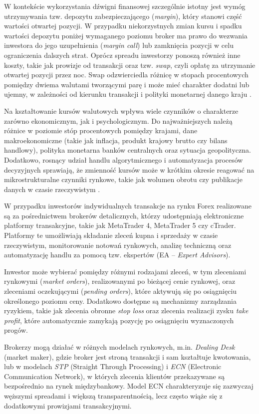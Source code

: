 W kontekście wykorzystania dźwigni finansowej szczególnie istotny jest wymóg utrzymywania tzw. depozytu zabezpieczającego (\textit{margin}), który stanowi część wartości otwartej pozycji. 
W przypadku niekorzystnych zmian kursu i spadku wartości depozytu poniżej wymaganego poziomu broker ma prawo do wezwania inwestora do jego uzupełnienia (\textit{margin call}) 
lub zamknięcia pozycji w celu ograniczenia dalszych strat. Oprócz spreadu inwestorzy ponoszą również inne koszty, takie jak prowizje od transakcji oraz tzw. \textit{swap}, 
czyli opłatę za utrzymanie otwartej pozycji przez noc. Swap odzwierciedla różnicę w stopach procentowych pomiędzy dwiema walutami tworzącymi parę i może mieć charakter dodatni lub ujemny, 
w zależności od kierunku transakcji i polityki monetarnej danego kraju \parencite{esma2018}.

Na kształtowanie kursów walutowych wpływa wiele czynników o charakterze zarówno ekonomicznym, jak i psychologicznym. 
Do najważniejszych należą różnice w poziomie stóp procentowych pomiędzy krajami, dane makroekonomiczne (takie jak inflacja, produkt krajowy brutto czy bilans handlowy), 
polityka monetarna banków centralnych oraz sytuacja geopolityczna. Dodatkowo, rosnący udział handlu algorytmicznego i automatyzacja procesów decyzyjnych sprawiają, 
że zmienność kursów może w krótkim okresie reagować na mikrostrukturalne czynniki rynkowe, takie jak wolumen obrotu czy publikacje danych w czasie rzeczywistym \parencite{chaboud2023}.

W przypadku inwestorów indywidualnych transakcje na rynku Forex realizowane są za pośrednictwem brokerów detalicznych, którzy udostępniają elektroniczne platformy transakcyjne, 
takie jak MetaTrader 4, MetaTrader 5 czy cTrader. Platformy te umożliwiają składanie zleceń kupna i sprzedaży w czasie rzeczywistym, monitorowanie notowań rynkowych, 
analizę techniczną oraz automatyzację handlu za pomocą tzw. ekspertów (EA – \textit{Expert Advisors}).

Inwestor może wybierać pomiędzy różnymi rodzajami zleceń, w tym zleceniami rynkowymi (\textit{market orders}), realizowanymi po bieżącej cenie rynkowej, oraz zleceniami oczekującymi (\textit{pending orders}), 
które aktywują się po osiągnięciu określonego poziomu ceny. Dodatkowo dostępne są mechanizmy zarządzania ryzykiem, takie jak zlecenia obronne \textit{stop loss} oraz zlecenia realizacji zysku \textit{take profit}, 
które automatycznie zamykają pozycję po osiągnięciu wyznaczonych progów.

Brokerzy mogą działać w różnych modelach rynkowych, m.in. \textit{Dealing Desk} (market maker), gdzie broker jest stroną transakcji i sam kształtuje kwotowania, 
lub w modelach \textit{STP} (Straight Through Processing) i \textit{ECN} (Electronic Communication Network), w których zlecenia klientów przekazywane są bezpośrednio na rynek międzybankowy. 
Model ECN charakteryzuje się zazwyczaj węższymi spreadami i większą transparentnością, lecz często wiąże się z dodatkowymi prowizjami transakcyjnymi.

